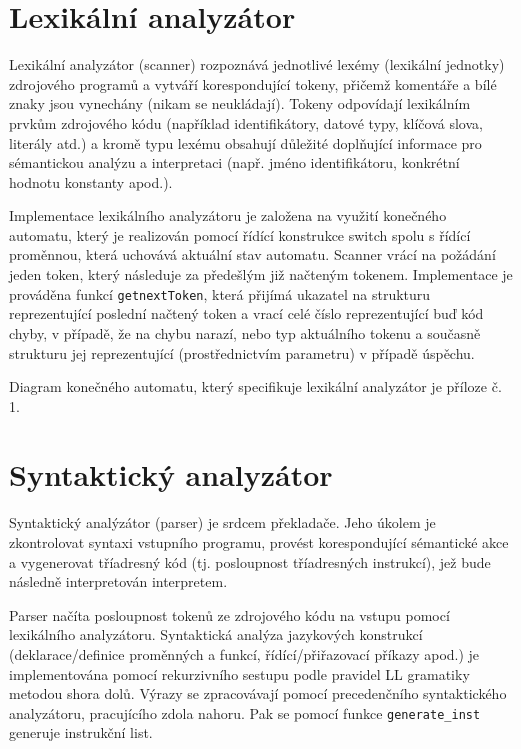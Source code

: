 \documentclass[12pt,a4paper,titlepage,final]{report}
\begin{document}
\section{Lexikální analyzátor}
Lexikální analyzátor (scanner) rozpoznává jednotlivé lexémy (lexikální jednotky) zdrojového programů a vytváří korespondující tokeny, přičemž komentáře a bílé znaky jsou vynechány (nikam se neukládají). Tokeny odpovídají lexikálním prvkům zdrojového kódu (například identifikátory, datové typy, klíčová slova, literály atd.) a kromě typu lexému obsahují důležité doplňující informace pro sémantickou analýzu a interpretaci (např. jméno identifikátoru, konkrétní hodnotu konstanty apod.).

Implementace lexikálního analyzátoru je založena na využití konečného automatu, který je realizován pomocí řídící konstrukce switch spolu s řídící proměnnou, která uchovává aktuální stav automatu. Scanner vrácí na požádání jeden token, který následuje za předešlým již načteným tokenem. Implementace je prováděna funkcí \texttt{getnextToken}, která přijímá ukazatel na strukturu reprezentující poslední načtený token a vrací celé číslo reprezentující buď kód chyby, v případě, že na chybu narazí, nebo typ aktuálního tokenu a současně strukturu jej reprezentující (prostřednictvím parametru) v případě úspěchu.

Diagram konečného automatu, který specifikuje lexikální analyzátor je příloze č. 1.

\section{Syntaktický analyzátor}
Syntaktický analýzátor (parser) je srdcem překladače. Jeho úkolem je zkontrolovat syntaxi vstupního programu, provést korespondující sémantické akce a vygenerovat tříadresný kód (tj. posloupnost tříadresných instrukcí), jež bude následně interpretován interpretem.

Parser načíta posloupnost tokenů ze zdrojového kódu na vstupu pomocí lexikálního analyzátoru. Syntaktická analýza jazykových konstrukcí (deklarace/definice proměnných a funkcí, řídící/přiřazovací příkazy apod.) je implementována pomocí rekurzivního sestupu podle pravidel LL gramatiky metodou shora dolů. Výrazy se zpracovávají pomocí precedenčního syntaktického analyzátoru, pracujícího zdola nahoru. Pak se pomocí funkce \texttt{generate\_inst} generuje instrukční list.
\end{document}
